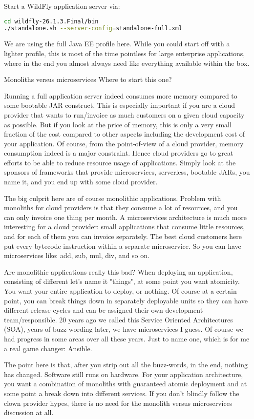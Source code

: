 Start a WildFly \cite{WildFly} application server via:
\begin{lstlisting}[language=bash]
cd wildfly-26.1.3.Final/bin
./standalone.sh --server-config=standalone-full.xml
\end{lstlisting}
We are using the full Java EE profile here.
While you could start off with a lighter profile, this is most of the time pointless for large enterprise applications, where in the end you almost always need like everything available within the box.
\begin{ClownComputing}{Monoliths versus microservices}
	Where to start this one?
	
	Running a full application server indeed consumes more memory compared to some bootable JAR construct.
	This is especially important if you are a cloud provider that wants to run/invoice as much customers on a given cloud capacity as possible.
	But if you look at the price of memory, this is only a very small fraction of the cost compared to other aspects including the development cost of your application.
	Of course, from the point-of-view of a cloud provider, memory consumption indeed is a major constraint.
	Hence cloud providers go to great efforts to be able to reduce resource usage of applications.
	Simply look at the sponsors of frameworks that provide microservices, serverless, bootable JARs, you name it,
	and you end up with some cloud provider.
	
	The big culprit here are of course monolithic applications.
	Problem with monoliths for cloud providers is that they consume a lot of resources, and you can only invoice one thing per month.
	A microservices architecture is much more interesting for a cloud provider: small applications that consume little resources,
	and for each of them you can invoice separately.
	The best cloud customers here put every bytecode instruction within a separate microservice.
	So you can have microservices like: add, sub, mul, div, and so on.
	
	Are monolithic applications really this bad?
	When deploying an application, consisting of different let's name it "things", at some point you want atomicity.
	You want your entire application to deploy, or nothing.
	Of course at a certain point, you can break things down in separately deployable units so they can have different release cycles and can be assigned their own development team/responsible.
	20 years ago we called this Service Oriented Architectures (SOA), years of buzz-wording later, we have microservices I guess.
	Of course we had progress in some areas over all these years. Just to name one, which is for me a real game changer: Ansible.
	
	The point here is that, after you strip out all the buzz-words, in the end, nothing has changed. Software still runs on hardware.
	For your application architecture, you want a combination of monoliths with guaranteed atomic deployment and at some point a break down into different services.
	If you don't blindly follow the clown provider hypes, there is no need for the monolith versus microservices discussion at all.
\end{ClownComputing}

